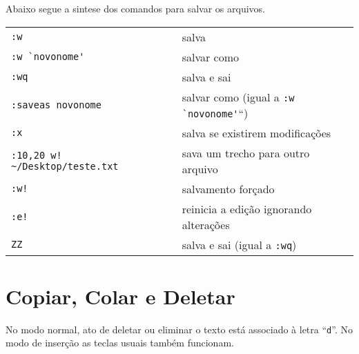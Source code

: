 Abaixo segue a sintese dos comandos para salvar os arquivos.
\begin{table}[htb]\begin{center} \begin{tabular}{ll} \hline
     \verb|:w| & salva\\
     \verb|:w `novonome'| & salvar como\\
     \verb|:wq| & salva e sai\\
     \verb|:saveas novonome| & salvar como (igual a \verb|:w `novonome'|``)\\
     \verb|:x| & salva se existirem modificações\\
     \verb|:10,20 w! ~/Desktop/teste.txt | & sava um trecho para outro arquivo\\
     \verb|:w!| & salvamento forçado\\
     \verb|:e!| & reinicia a edição ignorando alterações\\
     \verb|ZZ| & salva e sai (igual a \verb|:wq|)\\
\hline \end{tabular}\end{center}\end{table}

\section{Copiar, Colar e Deletar}\label{sec:CopiarColarEDeletar}
No modo normal, ato de deletar ou eliminar o texto está associado
à letra ``\verb|d|''. No modo de inserção as teclas usuais também 
funcionam.

